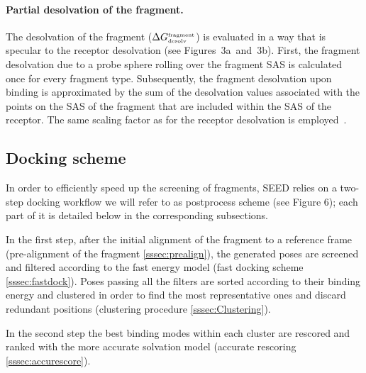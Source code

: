 \documentclass[a4paper,12pt,titlepage]{article}
\begin{document}
\paragraph{Partial desolvation of the fragment.}

The desolvation of the fragment 
($\Delta G^{\mbox{\tiny fragment}}_{\mbox{\tiny desolv}}$) 
is evaluated in a way that is specular to the 
receptor desolvation (see Figures~3a~and~3b). First, the fragment desolvation 
due to a probe sphere rolling over the fragment SAS is calculated once for 
every fragment type. Subsequently, the fragment desolvation upon binding is 
approximated by the sum of the desolvation values associated with the points 
on the SAS of the fragment that are included within the SAS of the receptor. 
The same scaling factor as for the receptor desolvation is employed~\cite{Majeux:Efficient}. 


\subsection{Docking scheme}
\label{ssec:Docking}


In order to efficiently speed up the screening of fragments, SEED relies on a two-step docking 
workflow we will refer to as postprocess scheme (see Figure 6); each part of it is detailed
below in the corresponding subsections.

\par In the first step, after the initial alignment of the fragment to a reference frame (pre-alignment of the fragment \ref{sssec:prealign}), 
the generated poses are screened and filtered according to the fast energy model 
(fast docking scheme \ref{sssec:fastdock}). Poses passing all the filters are 
sorted according to their
binding energy and clustered in order to find the most representative ones and discard redundant 
positions (clustering procedure \ref{sssec:Clustering}). 
\par In the second step the best binding modes within each cluster 
are rescored and ranked with the more accurate solvation model (accurate rescoring \ref{sssec:accurescore}).
\end{document}

